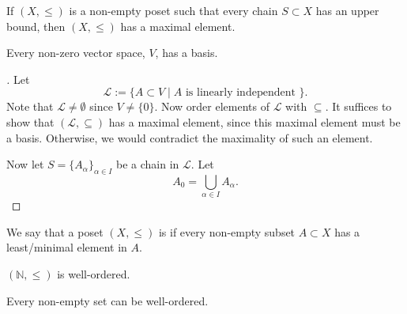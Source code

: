 \documentclass[notoc,notitlepage]{tufte-book}
\begin{document}
\begin{axiom}\label{axiom:zorn_s_lemma}
  If $(X, \leq)$ is a non-empty poset such that every chain $S \subset X$ has an upper bound, then $(X, \leq)$ has a maximal element.
\end{axiom}

\begin{thm}\label{thm:non_zero_vector_spaces_has_a_basis}
  Every non-zero vector space, $V$, has a basis.
\end{thm}
\begin{proof}[\faStar]
  Let
  \begin{equation*}
    \mathcal{L} := \{ A \subset V \mid A \text{ is linearly independent } \}.
  \end{equation*}
  Note that $\mathcal{L} \neq \emptyset$ since $V \neq \{ 0 \}$. Now order elements of $\mathcal{L}$ with $\subseteq$. It suffices to show that $(\mathcal{L}, \subseteq)$ has a maximal element, since this maximal element must be a basis. Otherwise, we would contradict the maximality of such an element.

  Now let $S = \{ A_\alpha \}_{\alpha \in I}$ be a chain in $\mathcal{L}$. Let
  \begin{equation*}
    A_0 = \bigcup_{\alpha \in I} A_\alpha.
  \end{equation*}
\end{proof}

\begin{defn}\label{defn:well_ordered}
\noindent We say that a poset $(X, \leq)$ is  if every non-empty subset $A \subset X$ has a least/minimal element in $A$.
\end{defn}

\begin{eg}
  $(\mathbb{N}, \leq)$ is well-ordered.
\end{eg}

\begin{axiom}\label{axiom:well_ordering_principle}
  Every non-empty set can be well-ordered.
\end{axiom}
\end{document}
